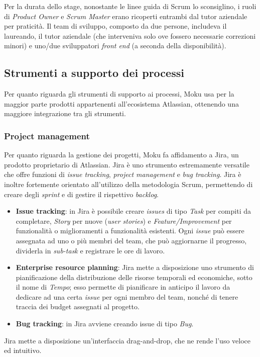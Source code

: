 Per la durata dello stage, nonostante le linee guida di Scrum lo sconsiglino, i ruoli di \textit{Product Owner} e \textit{Scrum Master} erano ricoperti entrambi dal tutor aziendale per praticità. Il team di sviluppo, composto da due persone, includeva il laureando, il tutor aziendale (che interveniva solo ove fossero necessarie correzioni minori) e uno/due sviluppatori \textit{front end} (a seconda della disponibilità).

\subsection{Strumenti a supporto dei processi}
Per quanto riguarda gli strumenti di supporto ai processi, Moku usa per la maggior parte prodotti appartenenti all'ecosistema Atlassian, ottenendo una maggiore integrazione tra gli strumenti.

\subsubsection{Project management}
Per quanto riguarda la gestione dei progetti, Moku fa affidamento a Jira, un prodotto proprietario di Atlassian. Jira è uno strumento estremamente versatile che offre funzioni di \textit{issue tracking}, \textit{project management} e \textit{bug tracking}. Jira è inoltre fortemente orientato all'utilizzo della metodologia Scrum, permettendo di creare degli \textit{sprint} e di gestire il rispettivo \textit{backlog}.
\begin{itemize}
    \item \textbf{Issue tracking}: in Jira è possibile creare \textit{issues} di tipo \textit{Task} per compiti da completare, \textit{Story} per nuove (\textit{user stories}) e \textit{Feature/Improvement} per funzionalità o miglioramenti a funzionalità esistenti. Ogni \textit{issue} può essere assegnata ad uno o più membri del team, che può aggiornarne il progresso, dividerla in \textit{sub-task} e registrare le ore di lavoro. 
    \item \textbf{Enterprise resource planning}: Jira mette a disposizione uno strumento di pianificazione della distribuzione delle risorse temporali ed economiche, sotto il nome di \textit{Tempo}; esso permette di pianificare in anticipo il lavoro da dedicare ad una certa \textit{issue} per ogni membro del team, nonché di tenere traccia dei budget assegnati al progetto.
    \item \textbf{Bug tracking}: in Jira avviene creando issue di tipo \textit{Bug}.
\end{itemize}
Jira mette a disposizione un'interfaccia drag-and-drop, che ne rende l'uso veloce ed intuitivo.

